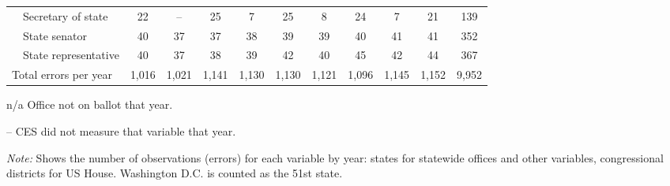 \begin{table}[!htbp]
{\begin{threeparttable}
\begin{tabular}{lcccccccccc}
~~Secretary of state & 22 & -- & 25 & 7 & 25 & 8 & 24 & 7 & 21 & 139 \\
~~State senator & 40 & 37 & 37 & 38 & 39 & 39 & 40 & 41 & 41 & 352 \\
~~State representative & 40 & 37 & 38 & 39 & 42 & 40 & 45 & 42 & 44 & 367 \\
\midrule
Total errors per year & 1,016 & 1,021 & 1,141 & 1,130 & 1,130 & 1,121 & 1,096 & 1,145 & 1,152 & 9,952 \\
\bottomrule
\end{tabular}
\begin{tablenotes}
\footnotesize
\item n/a Office not on ballot that year.
\item -- CES did not measure that variable that year.
\item \textit{Note:} Shows the number of observations (errors) for each variable by year: states for statewide offices and other variables, congressional districts for US House. Washington D.C. is counted as the 51st state.
\end{tablenotes}
\end{threeparttable}%
}
\end{table}